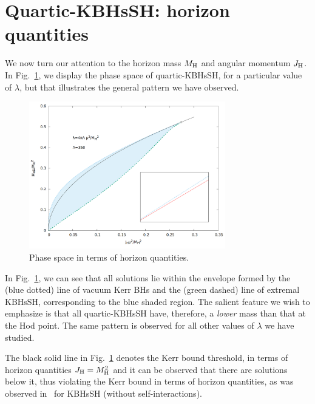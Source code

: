 \section{Quartic-KBHsSH: horizon quantities}
\label{sec_IV}

 
We now turn our attention to the horizon mass $M_{\rm H}$ and angular momentum $J_{\rm H}$. In Fig.~\ref{horizon_phase}, we display the phase space of quartic-KBHsSH, for a particular value of $\lambda$, but that illustrates the general pattern we have observed. 


\begin{figure}[h!]
  \begin{center}
    \includegraphics[width=8.55cm]{papers/selfInteractions/horizon-quantities.png}
      \end{center}
  \caption{Phase space in terms of horizon quantities.}
  \label{horizon_phase}
\end{figure}


In Fig.~\ref{horizon_phase}, we can see that all solutions lie within the envelope formed by the (blue dotted) line of vacuum Kerr BHs and the (green dashed) line of extremal KBHsSH, corresponding to the blue shaded region. The salient feature we wish to emphasize is that all quartic-KBHsSH have, therefore, a \textit{lower} mass than that at the Hod point. The same pattern is observed for all other values of $\lambda$ we have studied. 


The black solid line in Fig.~\ref{horizon_phase} denotes the Kerr bound threshold, in terms of horizon quantities $J_{\rm H}=M_{\rm H}^2$ and it can be observed that there are solutions below it, thus violating the Kerr bound in terms of horizon quantities, as was observed in~\cite{Herdeiro:2015moa} for KBHsSH (without self-interactions). 

